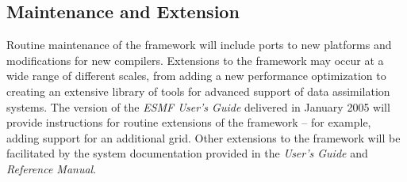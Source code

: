 \subsection {Maintenance and Extension} 

Routine maintenance of the framework will include ports to new 
platforms and modifications for new compilers.  Extensions to the 
framework may occur at a wide range of different scales, from adding
a new performance optimization to creating an extensive library
of tools for advanced support of data assimilation systems.  
The version of the {\it ESMF User's Guide} delivered in 
January 2005 will provide instructions for routine extensions of 
the framework -- for example, adding support for an additional grid.
Other extensions to the framework will be facilitated by the system
documentation provided in the {\it User's Guide} and {\it Reference Manual}.  











